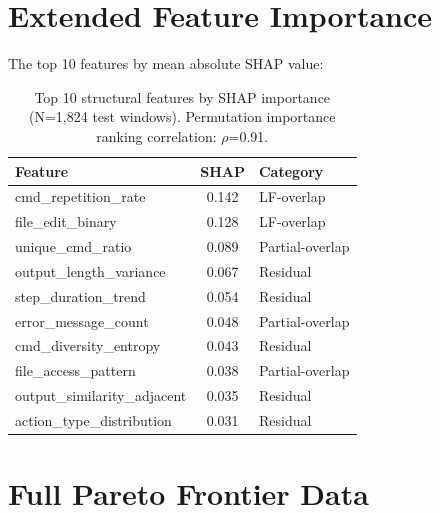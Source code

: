 \documentclass[11pt,a4paper]{article}
\begin{document}



\appendix

\section{Extended Feature Importance}
\label{app:shap}

The top 10 features by mean absolute SHAP value:

\begin{table}[h]
\centering
\small
\begin{tabular}{lcl}
\toprule
\textbf{Feature} & \textbf{SHAP} & \textbf{Category} \\
\midrule
cmd\_repetition\_rate & 0.142 & LF-overlap \\
file\_edit\_binary & 0.128 & LF-overlap \\
unique\_cmd\_ratio & 0.089 & Partial-overlap \\
output\_length\_variance & 0.067 & Residual \\
step\_duration\_trend & 0.054 & Residual \\
error\_message\_count & 0.048 & Partial-overlap \\
cmd\_diversity\_entropy & 0.043 & Residual \\
file\_access\_pattern & 0.038 & Partial-overlap \\
output\_similarity\_adjacent & 0.035 & Residual \\
action\_type\_distribution & 0.031 & Residual \\
\bottomrule
\end{tabular}
\caption{Top 10 structural features by SHAP importance (N=1{,}824 test windows). Permutation importance ranking correlation: $\rho$=0.91.}
\label{tab:shap_full}
\end{table}

\section{Full Pareto Frontier Data}
\label{app:pareto}
\end{document}
